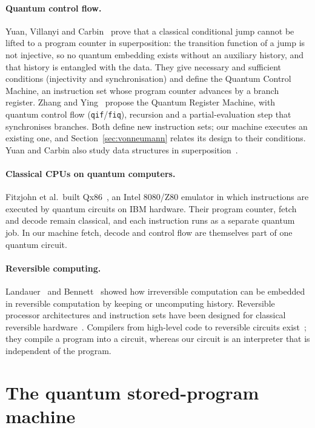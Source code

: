 \documentclass[11pt]{article}
\begin{document}
\paragraph{Quantum control flow.}
Yuan, Villanyi and Carbin~\cite{yuan2024qcm} prove that a classical conditional jump cannot
be lifted to a program counter in superposition: the transition function of a jump is not
injective, so no quantum embedding exists without an auxiliary history, and that history is
entangled with the data. They give necessary and sufficient conditions (injectivity and
synchronisation) and define the Quantum Control Machine, an instruction set whose program
counter advances by a branch register. Zhang and Ying~\cite{zhang2025qrm} propose the Quantum
Register Machine, with quantum control flow (\texttt{qif}/\texttt{fiq}), recursion and a
partial-evaluation step that synchronises branches. Both define new instruction sets; our
machine executes an existing one, and Section~\ref{sec:vonneumann} relates its design to their
conditions. Yuan and Carbin also study data structures in superposition~\cite{yuan2022tower}.

\paragraph{Classical CPUs on quantum computers.}
Fitzjohn et al.\ built Qx86~\cite{fitzjohn2022,fitzjohn2024}, an Intel 8080/Z80 emulator in
which instructions are executed by quantum circuits on IBM hardware. Their program counter,
fetch and decode remain classical, and each instruction runs as a separate quantum job. In
our machine fetch, decode and control flow are themselves part of one quantum circuit.

\paragraph{Reversible computing.}
Landauer~\cite{landauer1961} and Bennett~\cite{bennett1973} showed how irreversible
computation can be embedded in reversible computation by keeping or uncomputing history.
Reversible processor architectures and instruction sets have been designed for classical
reversible hardware~\cite{axelsen2007,vieri1999}. Compilers from high-level code to reversible
circuits exist~\cite{amy2017reverc}; they compile a program into a circuit, whereas our
circuit is an interpreter that is independent of the program.

\section{The quantum stored-program machine}
\label{sec:machine}
\end{document}
